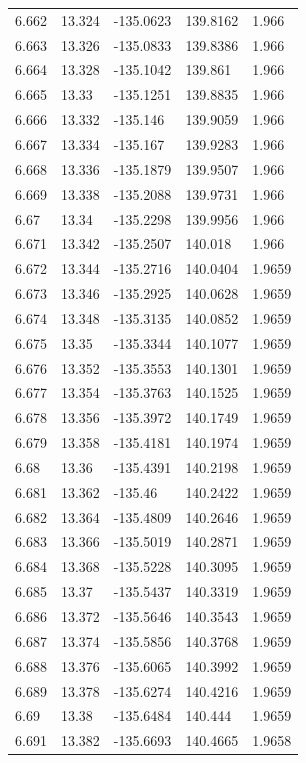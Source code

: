 \begin{tabular}{lllll}
6.662 & 13.324 & -135.0623 & 139.8162 & 1.966 \\
6.663 & 13.326 & -135.0833 & 139.8386 & 1.966 \\
6.664 & 13.328 & -135.1042 & 139.861 & 1.966 \\
6.665 & 13.33 & -135.1251 & 139.8835 & 1.966 \\
6.666 & 13.332 & -135.146 & 139.9059 & 1.966 \\
6.667 & 13.334 & -135.167 & 139.9283 & 1.966 \\
6.668 & 13.336 & -135.1879 & 139.9507 & 1.966 \\
6.669 & 13.338 & -135.2088 & 139.9731 & 1.966 \\
6.67 & 13.34 & -135.2298 & 139.9956 & 1.966 \\
6.671 & 13.342 & -135.2507 & 140.018 & 1.966 \\
6.672 & 13.344 & -135.2716 & 140.0404 & 1.9659 \\
6.673 & 13.346 & -135.2925 & 140.0628 & 1.9659 \\
6.674 & 13.348 & -135.3135 & 140.0852 & 1.9659 \\
6.675 & 13.35 & -135.3344 & 140.1077 & 1.9659 \\
6.676 & 13.352 & -135.3553 & 140.1301 & 1.9659 \\
6.677 & 13.354 & -135.3763 & 140.1525 & 1.9659 \\
6.678 & 13.356 & -135.3972 & 140.1749 & 1.9659 \\
6.679 & 13.358 & -135.4181 & 140.1974 & 1.9659 \\
6.68 & 13.36 & -135.4391 & 140.2198 & 1.9659 \\
6.681 & 13.362 & -135.46 & 140.2422 & 1.9659 \\
6.682 & 13.364 & -135.4809 & 140.2646 & 1.9659 \\
6.683 & 13.366 & -135.5019 & 140.2871 & 1.9659 \\
6.684 & 13.368 & -135.5228 & 140.3095 & 1.9659 \\
6.685 & 13.37 & -135.5437 & 140.3319 & 1.9659 \\
6.686 & 13.372 & -135.5646 & 140.3543 & 1.9659 \\
6.687 & 13.374 & -135.5856 & 140.3768 & 1.9659 \\
6.688 & 13.376 & -135.6065 & 140.3992 & 1.9659 \\
6.689 & 13.378 & -135.6274 & 140.4216 & 1.9659 \\
6.69 & 13.38 & -135.6484 & 140.444 & 1.9659 \\
6.691 & 13.382 & -135.6693 & 140.4665 & 1.9658 \\

\end{tabular}

